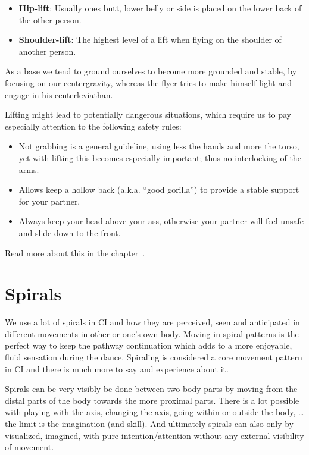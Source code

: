\begin{itemize}
    \item \textbf{Hip-lift}: Usually ones butt, lower belly or side is placed on the lower back of the other person.
    \item \textbf{Shoulder-lift}: The highest level of a lift when flying on the shoulder of another person.
\end{itemize}

As a base we tend to ground ourselves to become more grounded and stable, by focusing on our \gls{centergravity},
whereas the flyer tries to make himself light and engage in his \gls{centerleviathan}.

Lifting might lead to potentially dangerous situations, which require us to pay especially attention to the following safety rules:

\begin{itemize}
    \item Not grabbing is a general guideline, using less the hands and more the torso, yet with lifting this becomes especially important; thus no interlocking of the arms.
    \item Allows keep a hollow back (a.k.a. ``good gorilla'') to provide a stable support for your partner.
    \item Always keep your head above your ass, otherwise your partner will feel unsafe and slide down to the front.
\end{itemize}

Read more about this in the chapter~.

\section{Spirals}\label{sec:spirals}

We use a lot of spirals in CI and how they are perceived, seen and anticipated in different movements in other or one's own body.
Moving in spiral patterns is the perfect way to keep the pathway continuation which adds to a more enjoyable, fluid sensation during the dance.
Spiraling is considered a core movement pattern in CI and there is much more to say and experience about it.

Spirals can be very visibly be done between two body parts by moving from the distal parts of the body towards the more proximal parts.
There is a lot possible with playing with the axis, changing the axis, going within or outside the body, \ldots the limit is the imagination (and skill).
And ultimately spirals can also only by visualized, imagined, with pure intention/attention without any external visibility of movement.

